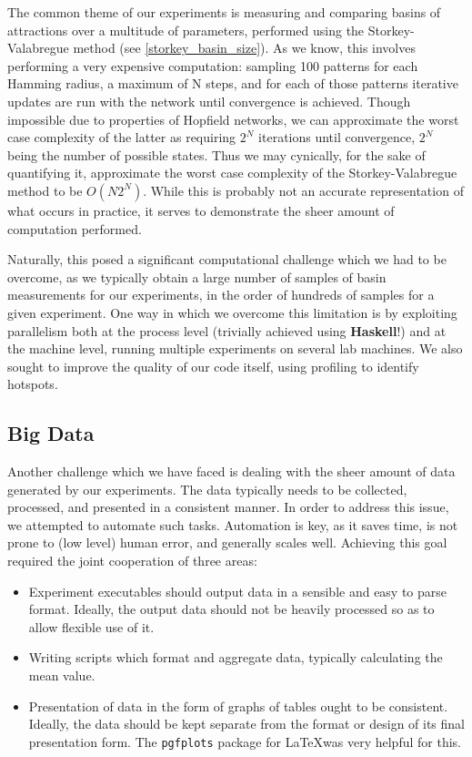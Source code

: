 The common theme of our experiments is measuring and comparing basins of attractions over a multitude of parameters, performed using the Storkey-Valabregue method (see \ref{storkey_basin_size}). As we know, this involves performing a very expensive computation: sampling 100 patterns for each Hamming radius, a maximum of N steps, and for each of those patterns iterative updates are run with the network until convergence is achieved. Though impossible due to properties of Hopfield networks, we can approximate the worst case complexity of the latter as requiring $2^N$ iterations until convergence, $2^N$ being the number of possible states. Thus we may cynically, for the sake of quantifying it, approximate the worst case complexity of the Storkey-Valabregue method to be $O(N2^N)$. While this is probably not an accurate representation of what occurs in practice, it serves to demonstrate the sheer amount of computation performed.

Naturally, this posed a significant computational challenge which we had to be overcome, as we typically obtain a large number of samples of basin measurements for our experiments, in the order of hundreds of samples for a given experiment. One way in which we overcome this limitation is by exploiting parallelism both at the process level (trivially achieved using \textbf{Haskell}!) and at the machine level, running multiple experiments on several lab machines. We also sought to improve the quality of our code itself, using profiling to identify hotspots. 


\subsection{Big Data}

Another challenge which we have faced is dealing with the sheer amount of data generated by our experiments. The data typically needs to be collected, processed, and presented in a consistent manner. In order to address this issue, we attempted to automate such tasks. Automation is key, as it saves time, is not prone to (low level) human error, and generally scales well. Achieving this goal required the joint cooperation of three areas:

\begin{itemize}
\item Experiment executables should output data in a sensible and easy to parse format. Ideally, the output data should not be heavily processed so as to allow flexible use of it.

\item Writing scripts which format and aggregate data, typically calculating the mean value.

\item Presentation of data in the form of graphs of tables ought to be consistent. Ideally, the data should be kept separate from the format or design of its final presentation form. The \texttt{pgfplots} package for \LaTeX was very helpful for this.
\end{itemize}



